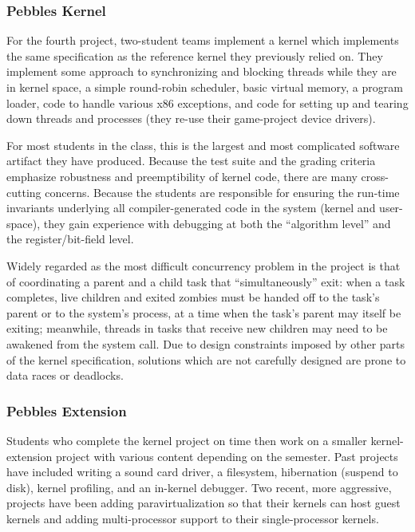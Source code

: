 \subsubsection{Pebbles Kernel}
For the fourth project, two-student teams
implement a kernel which implements the
same specification as the reference kernel
they previously relied on.
They implement some approach to
synchronizing and blocking threads while
they are in kernel space,
a simple round-robin scheduler,
basic virtual memory,
a program loader,
code to handle various x86 exceptions,
and code for setting up and tearing down
threads and processes
(they re-use their game-project device drivers).

For most students in the class, this is the
largest and most complicated software artifact they
have produced.
Because the test suite and the grading criteria
emphasize robustness and preemptibility of
kernel code,
there are many cross-cutting concerns.
%
Because the students are responsible for ensuring
the run-time invariants underlying all compiler-generated
code in the system (kernel and user-space),
they gain experience with debugging at both the
``algorithm level'' and the register/bit-field level.

Widely regarded as the most difficult concurrency problem in the project
is that of coordinating a parent and a child task that ``simultaneously''
exit:
when a task completes,
live children and exited zombies must be handed off
to the task's parent or to the system's  process,
at a time when the task's parent may itself be
exiting;
meanwhile, threads in tasks that receive new children
may need to be awakened from the  system call.
Due to design constraints imposed by other parts of the kernel specification,
solutions which are not carefully designed
are prone to data races or deadlocks.

\subsubsection{Pebbles Extension}
Students who complete the kernel project on time
then work on a smaller kernel-extension project
with various content depending on the semester.
Past projects have included
writing a sound card driver,
a filesystem,
hibernation (suspend to disk),
kernel profiling,
and an in-kernel debugger.
Two recent, more aggressive, projects have been
adding paravirtualization so that their kernels
can host guest kernels and
adding multi-processor support to their single-processor kernels.

